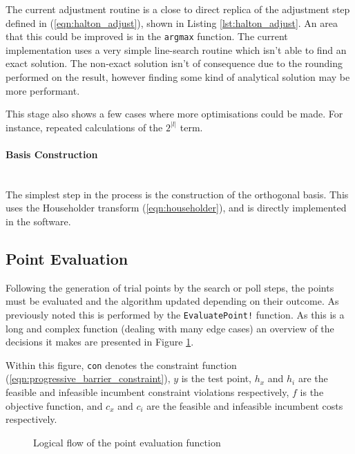 The current adjustment routine is a close to direct replica of the adjustment step defined in (\ref{eqn:halton_adjust}), shown in Listing \ref{lst:halton_adjust}. An area that this could be improved is in the \texttt{argmax} function. The current implementation uses a very simple line-search routine which isn't able to find an exact solution. The non-exact solution isn't of consequence due to the rounding performed on the result, however finding some kind of analytical solution may be more performant.



This stage also shows a few cases where more optimisations could be made. For instance, repeated calculations of the $2^{|l|}$ term.

\paragraph{Basis Construction}\\

The simplest step in the process is the construction of the orthogonal basis. This uses the Householder transform (\ref{eqn:householder}), and is directly implemented in the software. 


\subsection{Point Evaluation}
Following the generation of trial points by the search or poll steps, the points must be evaluated and the algorithm updated depending on their outcome. As previously noted this is performed by the \texttt{EvaluatePoint!} function. As this is a long and complex function (dealing with many edge cases) an overview of the decisions it makes are presented in Figure \ref{fig:eval_point_flow}.

Within this figure, \texttt{con} denotes the constraint function (\ref{eqn:progressive_barrier_constraint}), $y$ is the test point, $h_x$ and $h_i$ are the feasible and infeasible incumbent constraint violations respectively, $f$ is the objective function, and $c_x$ and $c_i$ are the feasible and infeasible incumbent costs respectively.

\begin{figure}[thb]
    \centering
    
    \caption{Logical flow of the point evaluation function}
    \label{fig:eval_point_flow}
\end{figure}

